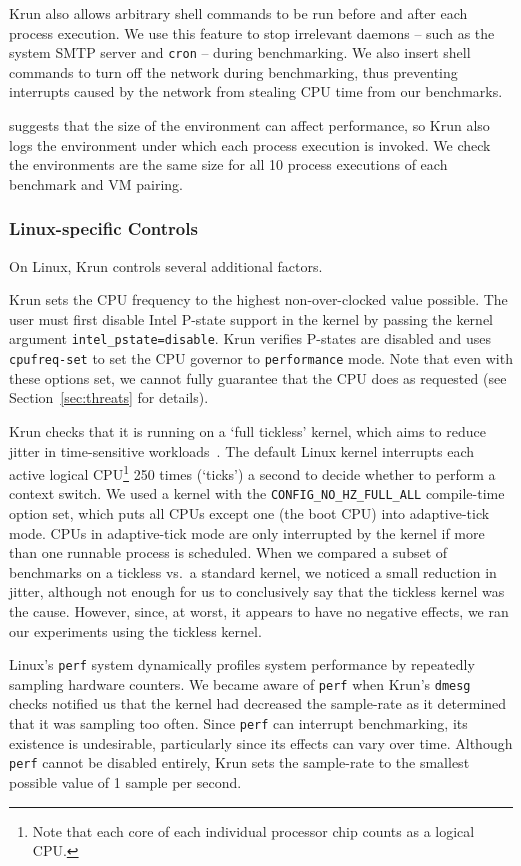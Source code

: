 \documentclass[preprint,numbers,10pt]{sigplanconf}
\newcommand{\krun}{Krun\xspace}
\begin{document}
\krun also allows arbitrary shell commands to be run before and after each
process execution. We use this feature to stop irrelevant daemons -- such as
the system SMTP server and \texttt{cron} -- during benchmarking. We also insert
shell commands to turn off the network during benchmarking, thus preventing
interrupts caused by the network from stealing CPU time from our benchmarks.

 suggests that the size of the environment can affect
performance, so \krun also logs the environment under which each process
execution is invoked. We check the environments are the same size for all 10
process executions of each benchmark and VM pairing.

\subsubsection{Linux-specific Controls}

On Linux, \krun controls several additional factors.

\krun sets the CPU frequency to the highest non-over-clocked value possible.
The user must first disable Intel P-state support in
the kernel by passing the kernel argument \texttt{intel\_pstate=disable}.
\krun verifies P-states are disabled and uses \texttt{cpufreq-set} to set
the CPU governor to \texttt{performance} mode. Note that even with these
options set, we cannot fully guarantee that the CPU does as requested
(see Section~\ref{sec:threats} for details).

\krun checks that it is running on a `full tickless' kernel, which aims to reduce
jitter in time-sensitive workloads~\cite{tickless}. The default
Linux kernel interrupts each active logical CPU\footnote{Note that each core of
each individual processor chip counts as a logical CPU.} 250 times (`ticks') a second to
decide whether to perform a context switch. We used a kernel with the
\texttt{CONFIG\_NO\_HZ\_FULL\_ALL} compile-time option set, which puts
all CPUs except one (the boot CPU) into adaptive-tick mode.
CPUs in adaptive-tick mode are only interrupted by the kernel if more than
one runnable process is scheduled.
When we compared a subset of benchmarks on a tickless vs.~a standard
kernel, we noticed a small reduction in jitter, although not enough for us to
conclusively say that the tickless kernel was the cause. However,
since, at worst, it appears to have no negative effects, we ran our experiments
using the tickless kernel.

Linux's \texttt{perf} system dynamically profiles system performance by
repeatedly sampling hardware counters. We became aware of \texttt{perf} when
\krun's \texttt{dmesg} checks notified us that the kernel had decreased the
sample-rate as it determined that it was sampling too often. Since \texttt{perf}
can interrupt benchmarking, its existence is undesirable, particularly since its
effects can vary over time. Although \texttt{perf} cannot be disabled entirely,
\krun sets the sample-rate to the smallest possible value of 1 sample per
second.
\end{document}
